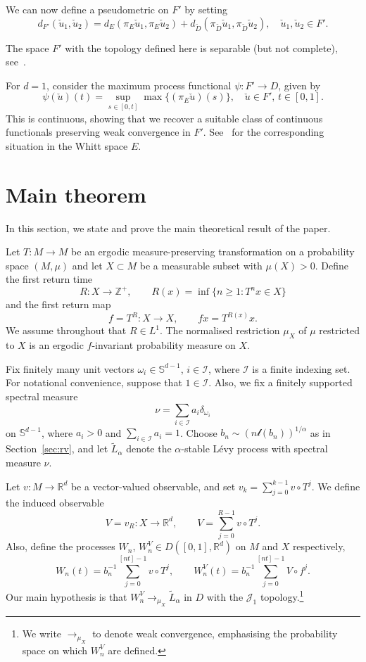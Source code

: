 \documentclass[12pt]{article}
\numberwithin{equation}{section}
\newcommand{\R}{{\mathbb R}}
\newcommand{\bbS}{{\mathbb S}}
\newcommand{\cI}{{\mathcal I}}
\newcommand{\cJ}{{\mathcal J}}
\newcommand{\tD}{{\widetilde D}}
\newcommand{\tL}{{\tilde L}}
\begin{document}
	We can now define a pseudometric on $F'$ by setting
	\[
	d_{F'}(\check u_1,\check u_2)=d_E(\pi_E \check u_1, \pi_E \check u_2)+ 
	d_\tD(\pi_\tD \check u_1, \pi_\tD \check u_2),
\quad \check u_1,\check u_2\in F'. 
	\]




	\begin{rmk} The space $F'$ with the topology defined here is separable (but not complete),
	see~\cite[Proposition~A.3(a)]{Freitas2Toddsub}.
	\end{rmk}

\begin{rmk} \label{rmk:psi}
For $d=1$, consider the maximum process functional $\psi:F'\to D$, 
given by
\[
\psi(\check u)(t)=\sup_{s\in[0,t]}\max\{(\pi_E\check u)(s)\},
\quad \check u\in F',\,t\in[0,1].
\]
This is continuous, showing that we recover a suitable class of continuous functionals preserving weak convergence in $F'$.
See~\cite[eq.~(5.5) and Theorem~15.5.1]{Whitt} for the corresponding situation in the Whitt space $E$.
\end{rmk}


	\section{Main theorem}
	\label{sec:main}

	In this section, we state and prove the main theoretical result of the paper.

	Let $T:M\to M$ be an ergodic measure-preserving transformation on a probability space $(M,\mu)$ and let $X\subset M$ be a measurable subset with $\mu(X)>0$.
	Define the first return time
	\[
	R:X\to{\mathbb Z}^+, \qquad R(x)=\inf\{n\ge1:T^nx\in X\}
	\]
	and the first return map
	\[
	f=T^R:X\to X, \qquad fx=T^{R(x)}x.
	\]
	We assume throughout that $R\in L^1$.
	The normalised restriction $\mu_X$ of $\mu$ restricted to $X$ is
	an ergodic $f$-invariant probability measure on $X$.

	Fix finitely many unit vectors 
	$\omega_i\in\bbS^{d-1}$, $i\in\cI$, where $\cI$ is a finite indexing set.
	For notational convenience, suppose that $1\in\cI$.
	Also, we fix a finitely supported spectral measure 
	\[
	\nu=\sum_{i\in\cI}a_i\delta_{\omega_i}
	\]
	on $\bbS^{d-1}$, where
	$a_i>0$ and $\sum_{i\in\cI}a_i=1$.
Choose $b_n\sim(n\mathcal{l}(b_n))^{1/\alpha}$ as in Section~\ref{sec:rv}, and
	let $\tL_\alpha$ denote the $\alpha$-stable L\'evy process with spectral measure $\nu$.

	Let $v:M\to\R^d$ be a vector-valued observable, and set 
	$v_k=\sum_{j=0}^{k-1}v\circ T^j$. We define the induced observable
	\[
	V=v_R:X\to\R^d, \qquad V=\sum_{j=0}^{R-1}v\circ T^j.
	\]
	Also, define the processes $W_n$, $W^V_n\in D([0,1],\R^d)$ on $M$ and $X$ respectively,
	\begin{equation} \label{eq:Wn}
	W_n(t)=b_n^{-1}\sum_{j=0}^{[nt]-1}v\circ T^j, \qquad
	W^V_n(t)=b_n^{-1}\sum_{j=0}^{[nt]-1}V\circ f^j.
	\end{equation}
	Our main hypothesis is that $W_n^V\to_{\mu_X}\tL_\alpha$ in $D$ with the $\cJ_1$ topology.\footnote{We write $\to_{\mu_X}$ to denote weak convergence, emphasising the probability space on which $W_n^V$ are defined.}
\end{document}
